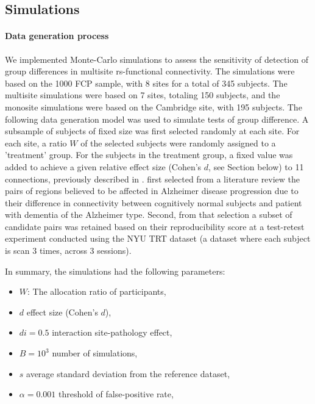 \documentclass[authoryear]{elsarticle}
\begin{document}
\subsection{Simulations}
\paragraph{Data generation process}

We implemented Monte-Carlo simulations to assess the sensitivity of detection of group differences in multisite rs-functional connectivity. The simulations were based on the 1000 FCP sample, with 8 sites for a total of 345 subjects. The multisite simulations were based on 7 sites, totaling 150 subjects, and the monosite simulations were based on the Cambridge site, with 195 subjects. The following data generation model was used to simulate tests of group difference. A subsample of subjects of fixed size was first selected randomly at each site. For each site, a ratio $W$ of the selected subjects were randomly assigned to a 'treatment' group. For the subjects in the treatment group, a fixed value was added to achieve a given relative effect size (Cohen's $d$, see Section below) to 11 connections, previously described in \cite{Orban2015}. \cite{Orban2015} first selected from a literature review the pairs of regions believed to be affected in Alzheimer disease progression due to their difference in connectivity between cognitively normal subjects and patient with dementia of the Alzheimer type. Second, from that selection a subset of candidate pairs was retained based on their reproducibility score at a test-retest experiment conducted using the NYU TRT dataset \citep{Zuo2010} (a dataset where each subject is scan 3 times, across 3 sessions).  

In summary, the simulations had the following parameters:

\begin{itemize}
 \item $W$: The allocation ratio of participants,
 \item $d$ effect size (Cohen’s $d$),
 \item $di=0.5$ interaction site-pathology effect,
 \item $B=10^3$ number of simulations,
 \item $s$ average standard deviation from the reference dataset,
 \item $\alpha=0.001$ threshold of false-positive rate,
\end{itemize}
\end{document}
